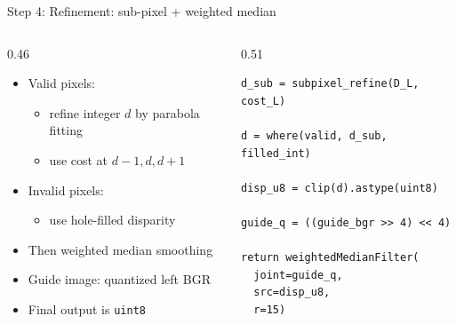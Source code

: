 \documentclass[aspectratio=169,11pt]{beamer}
\newcommand{\code}[1]{\texttt{#1}}
\begin{document}
\begin{frame}[fragile]{Step 4: Refinement: sub-pixel + weighted median}
\begin{columns}[T,totalwidth=\textwidth]
\begin{column}{0.46\textwidth}
\begin{itemize}
    \item Valid pixels:
    \begin{itemize}
        \item refine integer $d$ by parabola fitting
        \item use cost at $d-1,d,d+1$
    \end{itemize}
    \item Invalid pixels:
    \begin{itemize}
        \item use hole-filled disparity
    \end{itemize}
    \item Then weighted median smoothing
    \item Guide image: quantized left BGR
    \item Final output is \code{uint8}
\end{itemize}
\end{column}

\begin{column}{0.51\textwidth}
\scriptsize
\begin{verbatim}
d_sub = subpixel_refine(D_L, cost_L)

d = where(valid, d_sub, filled_int)

disp_u8 = clip(d).astype(uint8)

guide_q = ((guide_bgr >> 4) << 4)

return weightedMedianFilter(
  joint=guide_q,
  src=disp_u8,
  r=15)
\end{verbatim}
\end{column}
\end{columns}
\end{frame}
\end{document}
